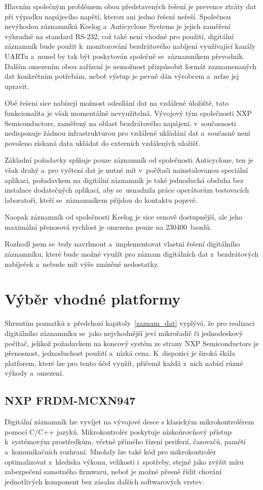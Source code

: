 Hlavním společným problémem obou představených řešení je prevence ztráty dat při výpadku napájecího napětí, kterou ani jedno řešení neřeší. Společnou nevýhodou záznamníků Keelog a~Anticyclone Systems je jejich zaměření výhradně na standard RS-232, což také není vhodné pro použití, digitální záznamník bude použit k~monitorování bezdrátového nabíjení využívající kanály UARTu a~musel by tak být poskytován společně se~záznamníkem převodník. Dalším omezením obou zařízení je nemožnost přizpůsobit formát zaznamenaných dat konkrétním potřebám, neboť výstup je pevně dán výrobcem a~nelze jej upravit.

Obě řešení sice nabízejí možnost odesílání dat na vzdálené úložiště, tato funkcionalita je však momentálně nevyužitelná. Vývojový tým společnosti NXP Semiconductors, zaměřený na oblast bezdrátového napájení, v~současnosti nedisponuje žádnou infrastrukturou pro vzdálené ukládání dat a~současně není povoleno získaná data ukládat do externích vzdálených uložišť.

Základní požadavky splňuje pouze záznamník od společnosti Anticyclone, ten je však drahý a~pro vyčtení dat je nutné mít v~počítači nainstalovanou speciální aplikaci, požadavkem na digitální záznamník je také jednoduchá obsluha bez instalace dodatečných aplikací, aby se~usnadnila práce operátorům testovacích laboratoří, kteří se~záznamníkem přijdou do kontaktu poprvé. 

Naopak záznamník od společnosti Keelog je sice cenově dostupnější, ale jeho maximální přenosová rychlost je omezena pouze na 230400~baudů.

Rozhodl jsem se~tedy navrhnout a~implementovat vlastní řešení digitálního záznamníku, které bude možné využít pro záznam digitálních dat z~bezdrátových nabíječek a~nebude mít výše zmíněné nedostatky.

\section{Výběr vhodné platformy}
\label{vyber_vhodne_platformy}
Shrnutím poznatků z~předchozí kapitoly~\ref{zaznam_dat} vyplývá, že pro realizaci digitálního záznamníku se~jako nejvhodnější jeví mikrořadič či jednodeskový počítač, jelikož požadavkem na koncový systém ze strany NXP Semiconductors je přenosnost, jednoduchost použití a~nízká cena. K~dispozici je široká škála platforem, které lze pro tento účel využít, přičemž každá z~nich nabízí různé výhody a~omezení.

\subsection{NXP FRDM-MCXN947}
\label{nxp_frdm_mcxn947}
Digitální záznamník lze vyvíjet na vývojové desce s klasickým mikrokontrolérem pomocí C/C++ jazyků. Mikrokontrolér poskytuje nízkoúrovňový přístup k~systémovým prostředkům, včetně přímého řízení periferií, časovačů, pamětí a~komunikačních rozhraní. Mnohdy lze také kód pro mikrokontrolér optimalizovat z~hlediska výkonu, velikosti i~spotřeby, stejně jako zvýšit míru zabezpečení samotného firmwaru, neboť je možné přesně řídit chování jednotlivých komponent bez zásahu dalších softwarových vrstev.

